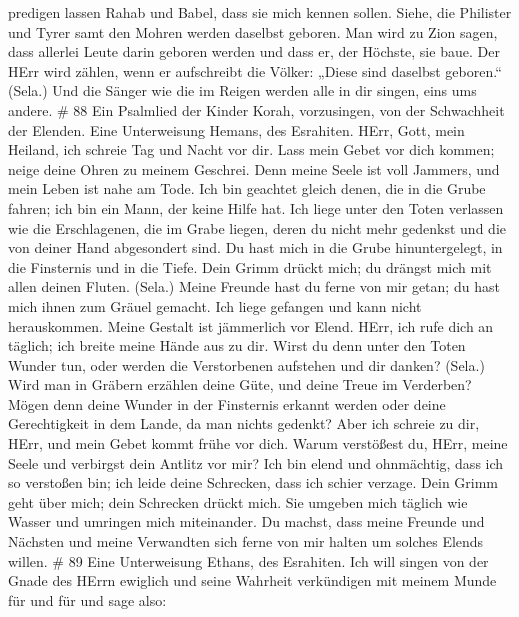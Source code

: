 predigen lassen Rahab und Babel, dass sie mich kennen sollen. Siehe, die
Philister und Tyrer samt den Mohren werden daselbst geboren.
 Man wird zu Zion sagen, dass allerlei Leute darin geboren
werden und dass er, der Höchste, sie baue.  Der HErr wird
zählen, wenn er aufschreibt die Völker: „Diese sind daselbst geboren.``
(Sela.)  Und die Sänger wie die im Reigen werden alle in dir
singen, eins ums andere. \# 88  Ein Psalmlied der Kinder
Korah, vorzusingen, von der Schwachheit der Elenden. Eine Unterweisung
Hemans, des Esrahiten.  HErr, Gott, mein Heiland, ich
schreie Tag und Nacht vor dir.  Lass mein Gebet vor dich
kommen; neige deine Ohren zu meinem Geschrei.  Denn meine
Seele ist voll Jammers, und mein Leben ist nahe am Tode. 
Ich bin geachtet gleich denen, die in die Grube fahren; ich bin ein
Mann, der keine Hilfe hat.  Ich liege unter den Toten
verlassen wie die Erschlagenen, die im Grabe liegen, deren du nicht mehr
gedenkst und die von deiner Hand abgesondert sind.  Du hast
mich in die Grube hinuntergelegt, in die Finsternis und in die Tiefe.
 Dein Grimm drückt mich; du drängst mich mit allen deinen
Fluten. (Sela.)  Meine Freunde hast du ferne von mir getan;
du hast mich ihnen zum Gräuel gemacht. Ich liege gefangen und kann nicht
herauskommen.  Meine Gestalt ist jämmerlich vor Elend.
HErr, ich rufe dich an täglich; ich breite meine Hände aus zu dir.
 Wirst du denn unter den Toten Wunder tun, oder werden die
Verstorbenen aufstehen und dir danken? (Sela.)  Wird man in
Gräbern erzählen deine Güte, und deine Treue im Verderben? 
Mögen denn deine Wunder in der Finsternis erkannt werden oder deine
Gerechtigkeit in dem Lande, da man nichts gedenkt?  Aber
ich schreie zu dir, HErr, und mein Gebet kommt frühe vor dich.
 Warum verstößest du, HErr, meine Seele und verbirgst dein
Antlitz vor mir?  Ich bin elend und ohnmächtig, dass ich so
verstoßen bin; ich leide deine Schrecken, dass ich schier verzage.
 Dein Grimm geht über mich; dein Schrecken drückt mich.
 Sie umgeben mich täglich wie Wasser und umringen mich
miteinander.  Du machst, dass meine Freunde und Nächsten
und meine Verwandten sich ferne von mir halten um solches Elends willen.
\# 89  Eine Unterweisung Ethans, des Esrahiten. 
Ich will singen von der Gnade des HErrn ewiglich und seine Wahrheit
verkündigen mit meinem Munde für und für  und sage also:
